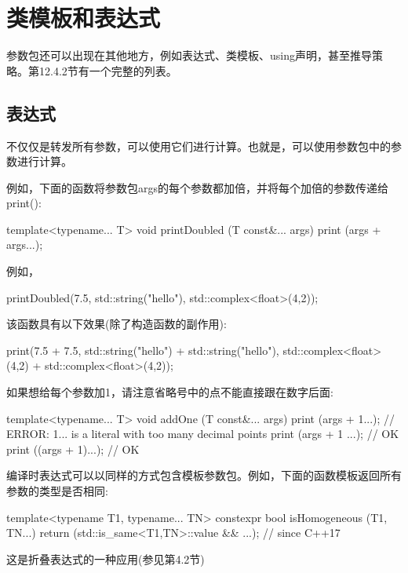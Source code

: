 \section{类模板和表达式}

参数包还可以出现在其他地方，例如表达式、类模板、using声明，甚至推导策略。第12.4.2节有一个完整的列表。

\subsection{表达式}

不仅仅是转发所有参数，可以使用它们进行计算。也就是，可以使用参数包中的参数进行计算。

例如，下面的函数将参数包args的每个参数都加倍，并将每个加倍的参数传递给print():

\begin{cpp}
template<typename... T>
void printDoubled (T const&... args)
{
	print (args + args...);
}
\end{cpp}

例如，

\begin{cpp}
printDoubled(7.5, std::string("hello"), std::complex<float>(4,2));
\end{cpp}

该函数具有以下效果(除了构造函数的副作用):

\begin{cpp}
print(7.5 + 7.5,
	std::string("hello") + std::string("hello"),
	std::complex<float>(4,2) + std::complex<float>(4,2));
\end{cpp}

如果想给每个参数加1，请注意省略号中的点不能直接跟在数字后面:

\begin{cpp}
template<typename... T>
void addOne (T const&... args)
{
	print (args + 1...); // ERROR: 1... is a literal with too many decimal points
	print (args + 1 ...); // OK
	print ((args + 1)...); // OK
}
\end{cpp}

编译时表达式可以以同样的方式包含模板参数包。例如，下面的函数模板返回所有参数的类型是否相同:

\begin{cpp}
template<typename T1, typename... TN>
constexpr bool isHomogeneous (T1, TN...)
{
	return (std::is_same<T1,TN>::value && ...); // since C++17
}
\end{cpp}

这是折叠表达式的一种应用(参见第4.2节)

